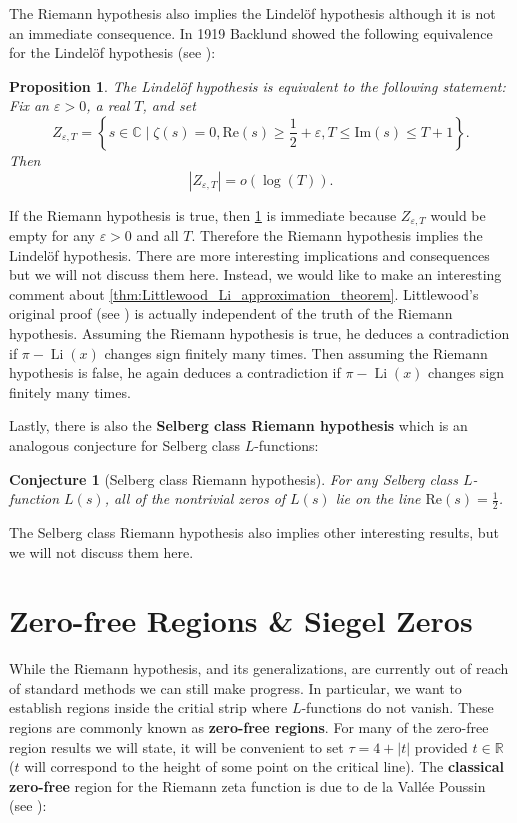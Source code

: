 \documentclass[12pt]{book}
\newtheorem{proposition}{Proposition}[section]
\newtheorem{conjecture}{Conjecture}[section]
\theoremstyle{definition}\newframedtheorem{method}{Method}
\newcommand{\R}{\mathbb{R}}
\newcommand{\C}{\mathbb{C}}
\newcommand{\z}{\zeta}
\newcommand{\e}{\varepsilon}
\newcommand{\<}{\langle}
\renewcommand{\>}{\rangle}
\DeclareMathOperator{\Li}{\mathrm{Li}}
\renewcommand{\Re}{\mathrm{Re}}
\renewcommand{\Im}{\mathrm{Im}}
\begin{document}
    The Riemann hypothesis also implies the Lindel\"of hypothesis although it is not an immediate consequence. In 1919 Backlund showed the following equivalence for the Lindel\"of hypothesis (see \cite{backlund1919beziehung}):

    \begin{proposition}\label{prop:Lindelof_hypothesis_equivalence}
      The Lindel\"of hypothesis is equivalent to the following statement: Fix an $\e > 0$, a real $T$, and set
      \[
        Z_{\e,T} = \left\{s \in \C \mid \z(s) = 0, \Re(s) \ge \frac{1}{2}+\e, T \le \Im(s) \le T+1 \right\}.
      \]
      Then
      \[
        |Z_{\e,T}| = o(\log(T)).
      \]
    \end{proposition}

    If the Riemann hypothesis is true, then \cref{prop:Lindelof_hypothesis_equivalence} is immediate because $Z_{\e,T}$ would be empty for any $\e > 0$ and all $T$. Therefore the Riemann hypothesis implies the Lindel\"of hypothesis. There are more interesting implications and consequences but we will not discuss them here. Instead, we would like to make an interesting comment about \cref{thm:Littlewood_Li_approximation_theorem}. Littlewood's original proof (see \cite{littlewood1914distribution}) is actually independent of the truth of the Riemann hypothesis. Assuming the Riemann hypothesis is true, he deduces a contradiction if $\pi-\Li(x)$ changes sign finitely many times. Then assuming the Riemann hypothesis is false, he again deduces a contradiction if $\pi-\Li(x)$ changes sign finitely many times.

    Lastly, there is also the \textbf{Selberg class Riemann hypothesis} which is an analogous conjecture for Selberg class $L$-functions:

    \begin{conjecture}[Selberg class Riemann hypothesis]
      For any Selberg class $L$-function $L(s)$, all of the nontrivial zeros of $L(s)$ lie on the line $\Re(s) = \frac{1}{2}$.
    \end{conjecture}

    The Selberg class Riemann hypothesis also implies other interesting results, but we will not discuss them here.
  \section{Zero-free Regions \& Siegel Zeros}
    While the Riemann hypothesis, and its generalizations, are currently out of reach of standard methods we can still make progress. In particular, we want to establish regions inside the critial strip where $L$-functions do not vanish. These regions are commonly known as \textbf{zero-free regions}. For many of the zero-free region results we will state, it will be convenient to set $\tau = 4+|t|$ provided $t \in \R$ ($t$ will correspond to the height of some point on the critical line). The \textbf{classical zero-free} region for the Riemann zeta function is due to de la Vall\'ee Poussin (see \cite{montgomery2007multiplicative}):
\end{document}
